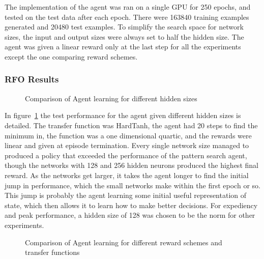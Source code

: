 The implementation of the agent was ran on a single GPU for 250 epochs, and tested on the test data after each epoch. There were  163840 training examples generated and 20480 test examples. To simplify the search space for network sizes, the input and output sizes were always set to half the hidden size. The agent was given a linear reward only at the last step for all the experiments except the one comparing reward schemes.

\subsubsection{RFO Results}
\begin{figure}
\centering

\caption{Comparison of Agent learning for different hidden sizes}
\label{fig:exp1rfo}
\end{figure}
In figure~\ref{fig:exp1rfo} the test performance for the agent given different hidden sizes is detailed. The transfer function was HardTanh, the agent had 20 steps to find the minimum in, the function was a one dimensional quartic, and the rewards were linear and given at episode termination. Every single network size managed to produced a policy that exceeded the performance of the pattern search agent, though the networks with 128 and 256 hidden neurons produced the highest final reward. As the networks get larger, it takes the agent longer to find the initial jump in performance, which the small networks make within the first epoch or so. This jump is probably the agent learning some initial useful representation of state, which then allows it to learn how to make better decisions. For expediency and peak performance, a hidden size of 128 was chosen to be the norm for other experiments.

\begin{figure}
\centering

\caption{Comparison of Agent learning for different reward schemes and transfer functions}
\label{fig:exp3rfo}
\end{figure}

